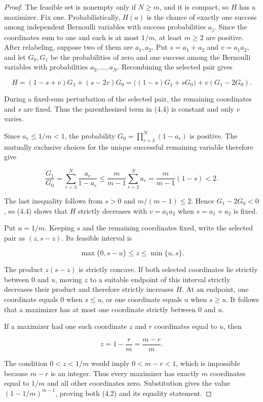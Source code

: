 \documentclass[11pt]{article}
\theoremstyle{remark}
\begin{document}
\begin{proof}
The feasible set is nonempty only if \(N\geq m\), and it is compact, so \(H\)
has a maximizer. Fix one. Probabilistically, \(H(a)\) is the chance of exactly
one success among independent Bernoulli variables with success probabilities
\(a_j\). Since the coordinates sum to one and each is at most \(1/m\), at
least \(m\geq2\) are positive. After relabeling, suppose two of them are
\(a_1,a_2\). Put \(s=a_1+a_2\) and \(v=a_1a_2\), and let \(G_0,G_1\) be the
probabilities of zero and one success among the Bernoulli variables with
probabilities \(a_3,\ldots,a_N\). Recombining the selected pair gives

\[
 H=(1-s+v)G_1+(s-2v)G_0
 =\bigl((1-s)G_1+sG_0\bigr)+v(G_1-2G_0).                 \tag{4.4}
\]

During a fixed-sum perturbation of the selected pair, the remaining
coordinates and \(s\) are fixed. Thus the parenthesized term in (4.4) is
constant and only \(v\) varies.

Since \(a_r\leq1/m<1\), the probability
\(G_0=\prod_{r=3}^N(1-a_r)\) is positive. The mutually exclusive choices for
the unique successful remaining variable therefore give

\[
 \frac{G_1}{G_0}
 =\sum_{r=3}^N\frac{a_r}{1-a_r}
 \leq\frac{m}{m-1}\sum_{r=3}^N a_r
 =\frac{m}{m-1}(1-s)<2.                                   \tag{4.5}
\]

The last inequality follows from \(s>0\) and \(m/(m-1)\leq2\). Hence
\(G_1-2G_0<0\), so (4.4) shows that \(H\) strictly decreases with
\(v=a_1a_2\) when \(s=a_1+a_2\) is fixed.

Put \(u=1/m\). Keeping \(s\) and the remaining coordinates fixed, write the
selected pair as \((z,s-z)\). Its feasible interval is

\[
 \max\{0,s-u\}\leq z\leq\min\{u,s\}.
\]

The product \(z(s-z)\) is strictly concave. If both selected coordinates lie
strictly between \(0\) and \(u\), moving \(z\) to a suitable endpoint of
this interval strictly decreases their product and therefore strictly increases
\(H\). At an endpoint, one coordinate equals \(0\) when \(s\leq u\), or one
coordinate equals \(u\) when \(s\geq u\). It follows that a maximizer has at
most one coordinate strictly between \(0\) and \(u\).

If a maximizer had one such coordinate \(z\) and \(r\) coordinates equal to
\(u\), then

\[
 z=1-\frac rm=\frac{m-r}{m}.
\]

The condition \(0<z<1/m\) would imply \(0<m-r<1\), which is impossible
because \(m-r\) is an integer. Thus every maximizer has exactly \(m\)
coordinates equal to \(1/m\) and all other coordinates zero. Substitution
gives the value \((1-1/m)^{m-1}\), proving both (4.2) and its equality
statement.
\end{proof}
\end{document}
